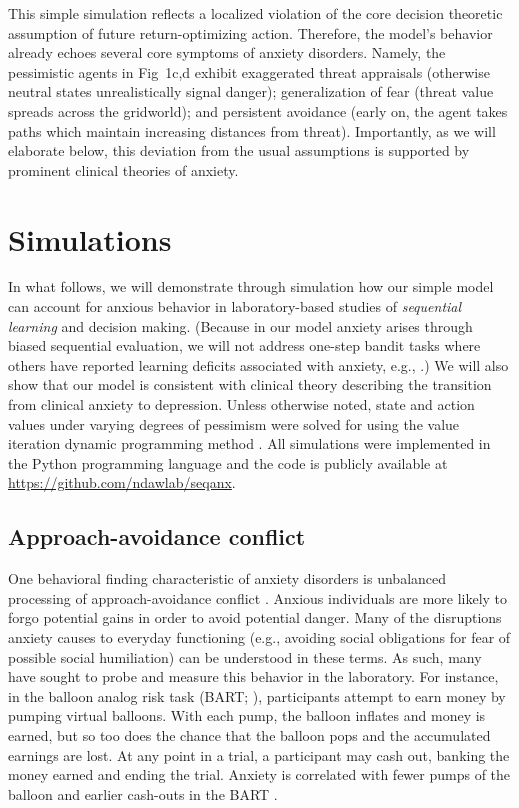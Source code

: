 \documentclass[manuscript]{stjour}
\begin{document}
This simple simulation reflects a localized violation of the core decision theoretic assumption of future return-optimizing action. Therefore, the model's behavior already echoes several core symptoms of anxiety disorders. Namely, the pessimistic agents in Fig~1c,d exhibit exaggerated threat appraisals (otherwise neutral states unrealistically signal danger); generalization of fear (threat value spreads across the gridworld); and persistent avoidance (early on, the agent takes paths which maintain increasing distances from threat). Importantly, as we will elaborate below, this deviation from the usual assumptions is supported by prominent clinical theories of anxiety.

\section{Simulations}

In what follows, we will demonstrate through simulation how our simple model can account for anxious behavior in laboratory-based studies of \emph{sequential learning}  and decision making. (Because in our model anxiety arises through biased sequential evaluation, we will not address one-step bandit tasks where others have reported learning deficits associated with anxiety, e.g., \citealp{Harle2017, Aylward2019}.) We will also show that our model is consistent with clinical theory describing the transition from clinical anxiety to depression. Unless otherwise noted, state and action values under varying degrees of pessimism were solved for using the value iteration dynamic programming method \citep{SuttonBarto2018}. All simulations were implemented in the Python programming language and the code is publicly available at \url{https://github.com/ndawlab/seqanx}. 

\subsection{Approach-avoidance conflict}

One behavioral finding characteristic of anxiety disorders is unbalanced processing of approach-avoidance conflict \citep{aupperle2010}. Anxious individuals are more likely to forgo potential gains in order to avoid potential danger. Many of the disruptions anxiety causes to everyday functioning (e.g., avoiding social obligations for fear of possible social humiliation) can be understood in these terms. As such, many have sought to probe and measure this behavior in the laboratory. For instance, in the balloon analog risk task (BART; \citealp{Lejuez2002}), participants attempt to earn money by pumping virtual balloons. With each pump, the balloon inflates and money is earned, but so too does the chance that the balloon pops and the accumulated earnings are lost. At any point in a trial, a participant may cash out, banking the money earned and ending the trial. Anxiety is correlated with fewer pumps of the balloon and earlier cash-outs in the BART \citep{Maner2007, ramirez2015}.
\end{document}
